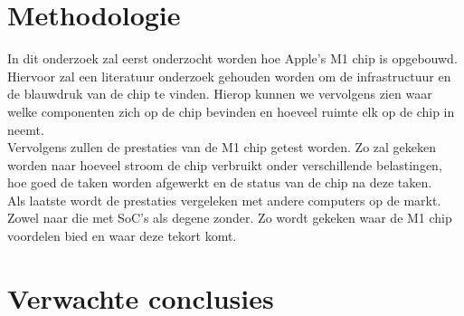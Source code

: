 \documentclass{hogent-article}
\begin{document}
\section{Methodologie}


In dit onderzoek zal eerst onderzocht worden hoe Apple's M1 chip is opgebouwd. Hiervoor zal een literatuur onderzoek gehouden worden om de infrastructuur en de blauwdruk van de chip te vinden. Hierop kunnen we vervolgens zien waar welke componenten zich op de chip bevinden en hoeveel ruimte elk op de chip in neemt. \\
Vervolgens zullen de prestaties van de M1 chip getest worden. Zo zal gekeken worden naar hoeveel stroom de chip verbruikt onder verschillende belastingen, hoe goed de taken worden afgewerkt en de status van de chip na deze taken. \\
Als laatste wordt de prestaties vergeleken met andere computers op de markt. Zowel naar die met SoC's als degene zonder. Zo wordt gekeken waar de M1 chip voordelen bied en waar deze tekort komt.

\section{Verwachte conclusies}

\end{document}
